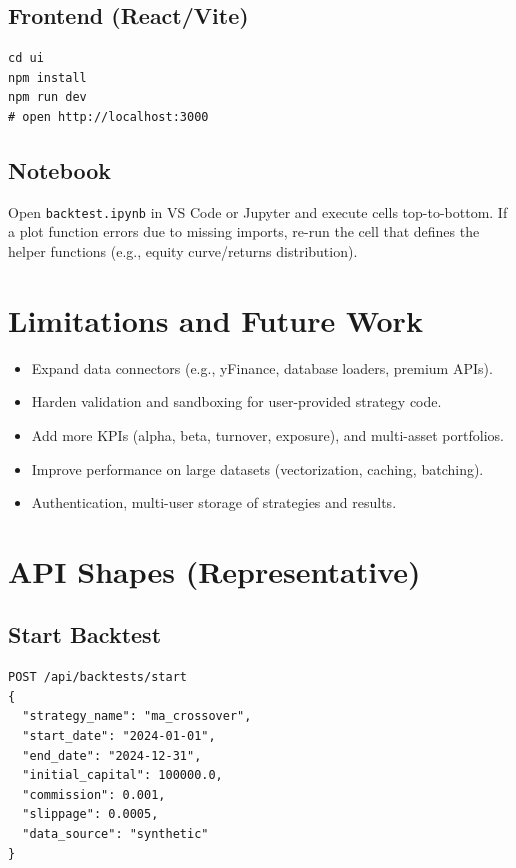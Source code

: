 \documentclass[11pt,a4paper]{article}
\begin{document}
\subsection*{Frontend (React/Vite)}
\begin{lstlisting}[style=code]
cd ui
npm install
npm run dev
# open http://localhost:3000
\end{lstlisting}

\subsection*{Notebook}
Open \texttt{backtest.ipynb} in VS Code or Jupyter and execute cells top-to-bottom. If a plot function errors due to missing imports, re-run the cell that defines the helper functions (e.g., equity curve/returns distribution).

\section{Limitations and Future Work}
\begin{itemize}[leftmargin=*]
  \item Expand data connectors (e.g., yFinance, database loaders, premium APIs).
  \item Harden validation and sandboxing for user-provided strategy code.
  \item Add more KPIs (alpha, beta, turnover, exposure), and multi-asset portfolios.
  \item Improve performance on large datasets (vectorization, caching, batching).
  \item Authentication, multi-user storage of strategies and results.
\end{itemize}

\appendix
\section{API Shapes (Representative)}
\subsection*{Start Backtest}
\begin{lstlisting}[style=code]
POST /api/backtests/start
{
  "strategy_name": "ma_crossover",
  "start_date": "2024-01-01",
  "end_date": "2024-12-31",
  "initial_capital": 100000.0,
  "commission": 0.001,
  "slippage": 0.0005,
  "data_source": "synthetic"
}
\end{lstlisting}
\end{document}
